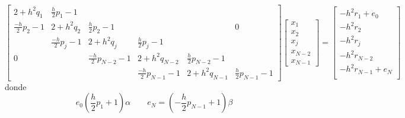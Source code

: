 \scriptsize
\begin{equation}
    \begin{bmatrix}
        2+h^2q_1          & \frac{h}{2}p_1-1                                                                                                \\
        \frac{-h}{2}p_2-1 & 2+h^2q_2          & \frac{h}{2}p_2-1      &                       &                      & 0                    \\
                          & \frac{-h}{2}p_j-1 & 2+h^2q_j              & \frac{h}{2}p_j-1                                                    \\
        0                 &                   & \frac{-h}{2}p_{N-2}-1 & 2+h^2q_{N-2}          & \frac{h}{2}p_{N-2}-1                        \\
                          &                   &                       & \frac{-h}{2}p_{N-1}-1 & 2+h^2q_{N-1}         & \frac{h}{2}p_{N-1}-1
    \end{bmatrix}\begin{bmatrix}
        x_1 \\ x_2 \\ x_j \\ x_{N-2} \\ x_{N-1}
    \end{bmatrix} = \begin{bmatrix}
        -h^2r_1+e_0     \\
        -h^2r_2         \\
        -h^2r_j         \\
        -h^2r_{N-2}     \\
        -h^2r_{N-1}+e_N \\
    \end{bmatrix}
    \label{eq:example_matrix}
\end{equation}
\normalsize
donde \begin{equation*}
    e_0 \left (\frac{h}{2}p_1+1\right ) \alpha \qquad e_N = \left (-\frac{h}{2}p_{N-1}+1\right )\beta
\end{equation*}
